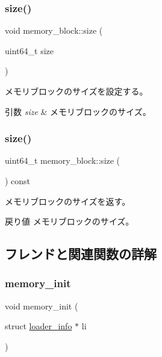 \subsubsection{\texorpdfstring{size()}{size()}\hspace{0.1cm}{\footnotesize\ttfamily [1/2]}}
{\footnotesize\ttfamily void memory\+\_\+block\+::size (\begin{DoxyParamCaption}\item[{uint64\+\_\+t}]{size }\end{DoxyParamCaption})}

メモリブロックのサイズを設定する。 
\begin{DoxyParams}{引数}
{\em size} & メモリブロックのサイズ。 \\
\hline
\end{DoxyParams}
\hypertarget{classmemory__block_a61bb79beaeb712e3ea9896058af4eda4}{}\label{classmemory__block_a61bb79beaeb712e3ea9896058af4eda4} 
\subsubsection{\texorpdfstring{size()}{size()}\hspace{0.1cm}{\footnotesize\ttfamily [2/2]}}
{\footnotesize\ttfamily uint64\+\_\+t memory\+\_\+block\+::size (\begin{DoxyParamCaption}{ }\end{DoxyParamCaption}) const}

メモリブロックのサイズを返す。 \begin{DoxyReturn}{戻り値}
メモリブロックのサイズ。 
\end{DoxyReturn}


\subsection{フレンドと関連関数の詳解}
\hypertarget{classmemory__block_a8840f01b46a3b9c43a461591a579c1bd}{}\label{classmemory__block_a8840f01b46a3b9c43a461591a579c1bd} 
\subsubsection{\texorpdfstring{memory\+\_\+init}{memory\_init}}
{\footnotesize\ttfamily void memory\+\_\+init (\begin{DoxyParamCaption}\item[{struct \hyperlink{structloader__info}{loader\+\_\+info} $\ast$}]{li }\end{DoxyParamCaption})\hspace{0.3cm}{\ttfamily [friend]}}

